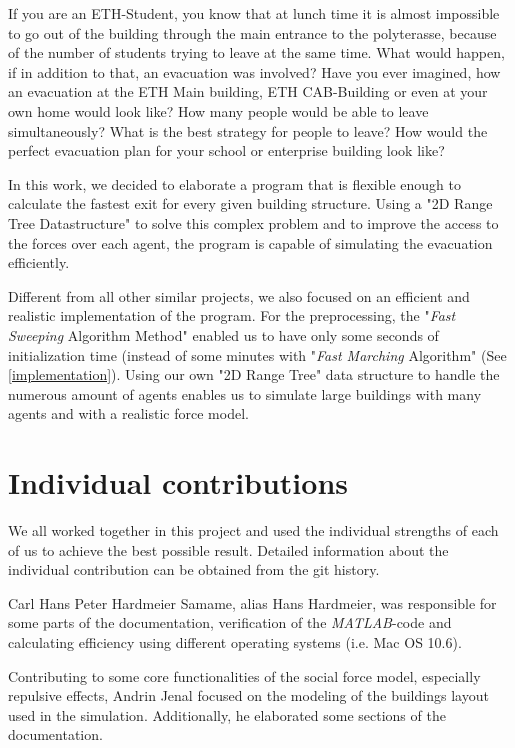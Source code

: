 \documentclass[11pt]{article}
\begin{document}
If you are an ETH-Student, you know that at lunch time it is almost impossible 
to go out of the building through the main entrance to the polyterasse, because
of the number of students trying to leave at the same time. What would happen,
if in addition to that, an evacuation was involved? Have you ever imagined, how
an evacuation at the ETH Main building, ETH CAB-Building or even at your own home
would look like? How many people would be able to leave simultaneously? What is the
best strategy for people to leave? How would the perfect evacuation plan for your
school or enterprise building look like?

In this work, we decided to elaborate a program that is flexible enough to
calculate the fastest exit for every given building structure. Using a "2D Range
Tree Datastructure" to solve this complex problem and to improve the access to
the forces over each agent, the program is capable of simulating the
evacuation efficiently.

Different from all other similar projects, we also focused on an efficient and
realistic implementation of the program. For the preprocessing, the "\textit{Fast
Sweeping} Algorithm Method" 
enabled us to have only some seconds of initialization time (instead of some
minutes with "\textit{Fast Marching} Algorithm" (See \ref{implementation}).
Using our own "2D Range Tree" data structure to handle the numerous amount of
agents enables us to simulate large buildings with many agents and with a
realistic force model.

\section{Individual contributions}

We all worked together in this project and used the individual strengths of each
of us to achieve the best possible result. Detailed information about the
individual contribution can be obtained from the git history.

Carl Hans Peter Hardmeier Samame, alias Hans Hardmeier, was 
responsible for some parts of the documentation, verification of the
\textit{MATLAB}-code and calculating efficiency using different operating
systems (i.e. Mac OS 10.6).

Contributing to some core functionalities of the social force model, especially repulsive effects,
Andrin Jenal focused on the modeling of the buildings layout used in the simulation.
Additionally, he elaborated some sections of the documentation.
\end{document}
